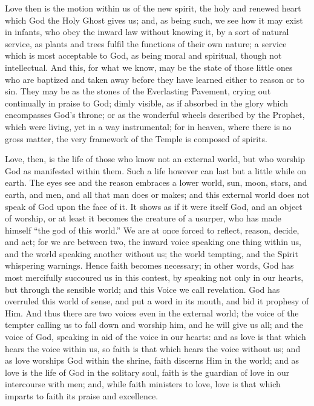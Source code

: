 Love then is the motion within us of the new spirit, the holy and
renewed heart which God the Holy Ghost gives us; and, as being such,
we see how it may exist in infants, who obey the inward law without
knowing it, by a sort of natural service, as plants and trees fulfil
the functions of their own nature; a service which is most acceptable
to God, as being moral and spiritual, though not intellectual. And
this, for what we know, may be the state of those little ones who are
baptized and taken away before they have learned either to reason or
to sin. They may be as the stones of the Everlasting Pavement, crying
out continually in praise to God; dimly visible, as if absorbed in the
glory which encompasses God's throne; or as the wonderful wheels
described by the Prophet, which were living, yet in a way
instrumental; for in heaven, where there is no gross matter, the very
framework of the Temple is composed of spirits.

Love, then, is the life of those who know not an external world,
but who worship God as manifested within them. Such a life however can
last but a little while on earth. The eyes see and the reason embraces
a lower world, sun, moon, stars, and earth, and men, and all that man
does or makes; and this external world does not speak of God upon the
face of it. It shows as if it were itself God, and an object of
worship, or at least it becomes the creature of a usurper, who has
made himself ``the god of this world.'' We are at once forced
to reflect, reason, decide, and act; for we are between two, the
inward voice speaking one thing within us, and the world speaking
another without us; the world tempting, and the Spirit whispering
warnings. Hence faith becomes necessary; in other words, God has most
mercifully succoured us in this contest, by speaking not only in our
hearts, but through the sensible world; and this Voice we call
revelation. God has overruled this world of sense, and put a word in
its mouth, and bid it prophesy of Him. And thus there are two voices
even in the external world; the voice of the tempter calling us to
fall down and worship him, and he will give us all; and the voice of
God, speaking in aid of the voice in our hearts: and as love is that
which hears the voice within us, so faith is that which hears the
voice without us; and as love worships God within the shrine, faith
discerns Him in the world; and as love is the life of God in the
solitary soul, faith is the guardian of love in our intercourse with
men; and, while faith ministers to love, love is that which imparts to
faith its praise and excellence.

